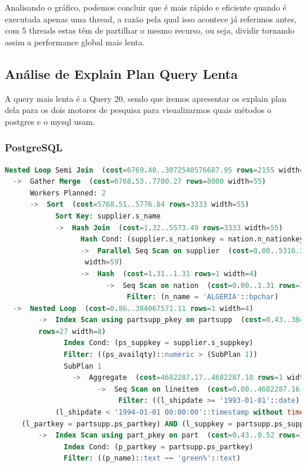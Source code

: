 \documentclass{article}
\begin{document}
Analisando o gráfico, podemos concluir que é mais rápido e eficiente quando é executada apenas uma thread, a razão pela qual isso acontece já referimos antes, com 5 threads estas têm de partilhar o mesmo recurso, ou seja, dividir tornando assim a performance global mais lenta.


\clearpage
\subsection{Análise de Explain Plan Query Lenta}
A query mais lenta é a Query 20, sendo que iremos apresentar os explain plan dela para os dois motores de pesquisa para visualizarmos quais métodos o postgres e o mysql usam.
\subsubsection{PostgreSQL}
\begin{lstlisting}[language=SQL]
Nested Loop Semi Join  (cost=6769.40..3072540576687.95 rows=2155 width=51)
  ->  Gather Merge  (cost=6768.53..7700.27 rows=8000 width=55)
      Workers Planned: 2
      ->  Sort  (cost=5768.51..5776.84 rows=3333 width=55)
            Sort Key: supplier.s_name
            ->  Hash Join  (cost=1.32..5573.49 rows=3333 width=55)
                  Hash Cond: (supplier.s_nationkey = nation.n_nationkey)
                  ->  Parallel Seq Scan on supplier  (cost=0.00..5316.33 rows=83333
                   width=59)
                  ->  Hash  (cost=1.31..1.31 rows=1 width=4)
                        ->  Seq Scan on nation  (cost=0.00..1.31 rows=1 width=4)
                             Filter: (n_name = 'ALGERIA'::bpchar)
  ->  Nested Loop  (cost=0.86..384067571.11 rows=1 width=4)
        ->  Index Scan using partsupp_pkey on partsupp  (cost=0.43..384067557.06 
        rows=27 width=8)
              Index Cond: (ps_suppkey = supplier.s_suppkey)
              Filter: ((ps_availqty)::numeric > (SubPlan 1))
              SubPlan 1
                ->  Aggregate  (cost=4682287.17..4682287.18 rows=1 width=32)
                      ->  Seq Scan on lineitem  (cost=0.00..4682287.16 rows=1 width=5)
                           Filter: ((l_shipdate >= '1993-01-01'::date) AND 
            (l_shipdate < '1994-01-01 00:00:00'::timestamp without time zone) AND 
    (l_partkey = partsupp.ps_partkey) AND (l_suppkey = partsupp.ps_suppkey))
        ->  Index Scan using part_pkey on part  (cost=0.43..0.52 rows=1 width=4)
              Index Cond: (p_partkey = partsupp.ps_partkey)
              Filter: ((p_name)::text ~~ 'green%'::text)
  \end{lstlisting}
\end{document}
